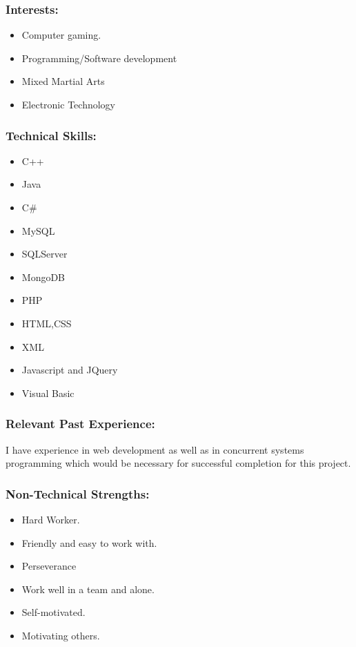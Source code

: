 \subsubsection{Interests:}
	\begin{itemize}
		\item Computer gaming.
		\item Programming/Software development
		\item Mixed Martial Arts
		\item Electronic Technology
	\end{itemize}
		
\subsubsection{Technical Skills:}
	\begin{itemize}
		\item C++
		\item Java
		\item	C\#
		\item	MySQL
		\item	SQLServer
		\item	MongoDB
		\item PHP
		\item HTML,CSS
		\item XML
		\item Javascript and JQuery
		\item Visual Basic 
	\end{itemize}

\subsubsection{Relevant Past Experience:}
	\par{I have experience in web development as well as in concurrent systems programming which would be necessary for successful completion for this project.}

\subsubsection{Non-Technical Strengths:}
	\begin{itemize}
		\item Hard Worker.
		\item Friendly and easy to work with.
		\item Perseverance
		\item Work well in a team and alone.
		\item Self-motivated.
		\item Motivating others.
	\end{itemize}

